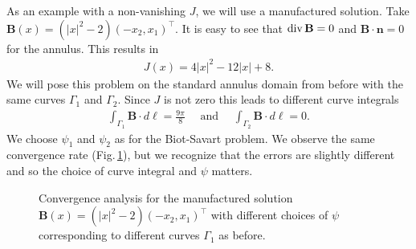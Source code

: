 \documentclass[../master_thesis.tex]{subfiles}
\begin{document}
As an example with a non-vanishing $J$, we will use a manufactured solution. 
Take $\mathbf{B}(x) = (|x|^2 -2) (-x_2,x_1)^\top$. It is easy to see that 
$\operatorname{div} \mathbf{B} = 0$ and 
$\mathbf{B}\cdot \mathbf{n} = 0$ for the annulus. 
This results in   
\begin{align*}
    J(x) = 4 |x|^2 - 12 |x| + 8.
\end{align*}
We will pose this problem on the standard annulus domain from before with the same 
curves $\Gamma_1$ and $\Gamma_2$. 
Since $J$ is not zero this leads to different curve integrals
\begin{align*}
    \int_{\Gamma_1} \mathbf{B}\cdot d\ell = \frac{9\pi}{8} \quad \text{  and  } \quad
    \int_{\Gamma_2} \mathbf{B}\cdot d\ell = 0.
\end{align*}
We choose $\psi_1$ and $\psi_2$ as for the Biot-Savart problem. We observe the same convergence rate 
(Fig.\,\ref{fig:convergence_analysis_manufactured}), but we recognize that 
the errors are slightly different and so the choice of curve integral and 
$\psi$ matters. 

\begin{figure}
    \centering
    \caption{Convergence analysis for the manufactured solution $\mathbf{B}(x) = (|x|^2 -2) (-x_2,x_1)^\top$
        with different choices of $\psi$ corresponding to different curves $\Gamma_1$ as before.
    }
    \label{fig:convergence_analysis_manufactured}
\end{figure}    
\end{document}
